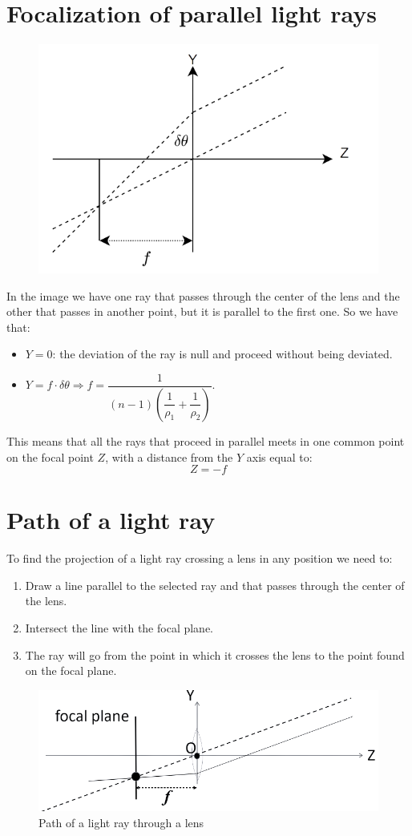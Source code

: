\documentclass[12pt, a4paper]{report}
\begin{document}
    \section{Focalization of parallel light rays}
    \begin{figure}[H]
        \centering
        \includegraphics[width=0.5\linewidth]{images/focalization.png}
    \end{figure}
    In the image we have one ray that passes through the center of the lens and the other that passes in another point, but it is parallel to the first one. So we have that: 
    \begin{itemize}
        \item $Y=0$: the deviation of the ray is null and proceed without being deviated. 
        \item $Y=f \cdot \delta \theta \Rightarrow f=\dfrac{1}{(n-1)\left( \dfrac{1}{\rho_1} + \dfrac{1}{\rho_2}\right)}$. 
    \end{itemize}
    This means that all the rays that proceed in parallel meets in one common point on the focal point $Z$, with a distance from the $Y$ axis equal to: 
    \[Z=-f\]

    \section{Path of a light ray}
    To find the projection of a light ray crossing a lens in any position we need to:
    \begin{enumerate}
        \item Draw a line parallel to the selected ray and that passes through the center of the lens. 
        \item Intersect the line with the focal plane.
        \item The ray will go from the point in which it crosses the lens to the point found on the focal plane. 
    \end{enumerate}
    \begin{figure}[H]
        \centering
        \includegraphics[width=0.5\linewidth]{images/path.png}
        \caption{Path of a light ray through a lens}
    \end{figure}
\end{document}
